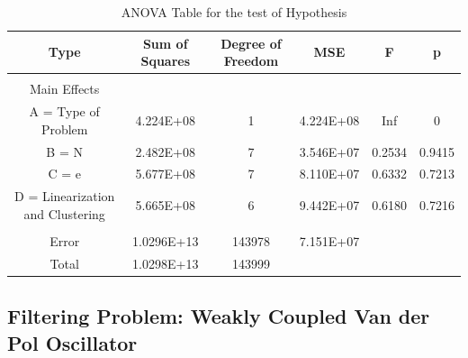 \begin{table}[H]
\scriptsize{
\begin{center}
\caption{ANOVA Table for the test of Hypothesis}
\label{anova}
\begin{tabular}{|c|c|c|c|c|c|}
\hline
Type & Sum of Squares & Degree of Freedom & MSE & F & p \\ \hline
& & & & &  \\ \hline
Main Effects & & & & &  \\ \hline
A = Type of Problem    &    4.224E+08    &    1    &    4.224E+08    &    Inf    &    0    \\ \hline
B = N    &    2.482E+08    &    7    &    3.546E+07    &    0.2534    &    0.9415    \\ \hline
C = e    &    5.677E+08    &    7    &    8.110E+07    &    0.6332    &    0.7213    \\ \hline
D = Linearization and Clustering    &    5.665E+08    &    6    &    9.442E+07    &    0.6180    &    0.7216    \\ \hline
    &        &        &        &        &        \\ \hline
Error    &    1.0296E+13    &    143978    &    7.151E+07    &        &        \\ \hline
Total    &    1.0298E+13    &    143999    &        &        &        \\ \hline
\end{tabular}
\end{center}
}
\end{table}

\subsection{Filtering Problem: Weakly Coupled Van der Pol Oscillator}

